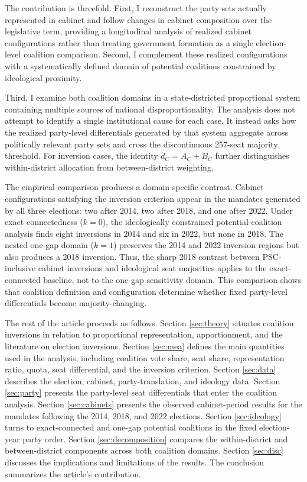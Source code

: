 \documentclass[11pt]{article}
\begin{document}
The contribution is threefold. First, I reconstruct the party sets actually
represented in cabinet and follow changes in cabinet composition over the
legislative term, providing a longitudinal analysis of realized cabinet
configurations rather than treating government formation as a single
election-level coalition comparison. Second, I complement these realized
configurations with a systematically defined domain of potential coalitions
constrained by ideological proximity.

Third, I examine both coalition domains in a state-districted proportional
system containing multiple sources of national disproportionality. The
analysis does not attempt to identify a single institutional cause for each
case. It instead asks how the realized party-level differentials generated by
that system aggregate across politically relevant party sets and cross the
discontinuous 257-seat majority threshold. For inversion cases, the identity
\(d_C=A_C+B_C\) further distinguishes within-district allocation from
between-district weighting.

The empirical comparison produces a domain-specific contrast. Cabinet
configurations satisfying the inversion criterion appear in the mandates
generated by all three elections: two after 2014, two after 2018, and one after
2022. Under exact connectedness (\(k=0\)), the ideologically constrained
potential-coalition analysis finds eight inversions in 2014 and six in 2022,
but none in 2018. The nested one-gap domain (\(k=1\)) preserves the 2014 and
2022 inversion regions but also produces a 2018 inversion. Thus, the sharp 2018
contrast between PSC-inclusive cabinet inversions and ideological seat
majorities applies to the exact-connected baseline, not to the one-gap
sensitivity domain. This comparison shows that coalition definition and
configuration determine whether fixed party-level differentials become
majority-changing.

The rest of the article proceeds as follows. Section \ref{sec:theory}
situates coalition inversions in relation to proportional representation,
apportionment, and the literature on election inversions. Section
\ref{sec:mea} defines the main quantities used in the analysis, including
coalition vote share, seat share, representation ratio, quota, seat
differential, and the inversion criterion. Section \ref{sec:data} describes
the election, cabinet, party-translation, and ideology data. Section
\ref{sec:party} presents the party-level seat differentials that enter the coalition analysis. Section
\ref{sec:cabinets} presents the observed cabinet-period results for the
mandates following the 2014, 2018, and 2022 elections. Section
\ref{sec:ideology} turns to exact-connected and one-gap potential coalitions in
the fixed election-year party order. Section
\ref{sec:decomposition} compares the within-district and between-district
components across both coalition domains.
Section \ref{sec:disc} discusses the implications and limitations of the
results. The conclusion summarizes the article's contribution.
\end{document}
